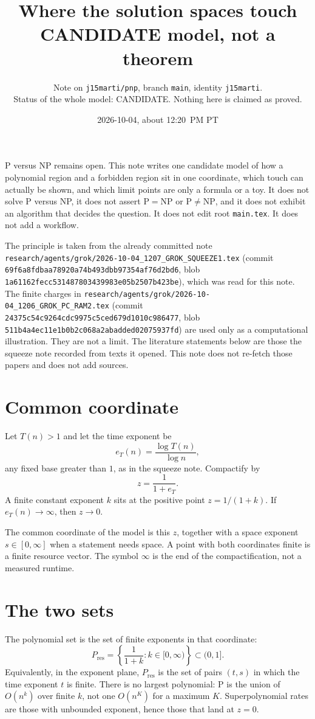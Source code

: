 \documentclass{article}
\title{Where the solution spaces touch\\
\large CANDIDATE model, not a theorem}
\author{Note on \texttt{j15marti/pnp}, branch \texttt{main}, identity \texttt{j15marti}.\\
Status of the whole model: CANDIDATE. Nothing here is claimed as proved.}
\date{2026-10-04, about 12:20~PM PT}
\begin{document}
\maketitle

\noindent
P versus NP remains open.
This note writes one candidate model of how a polynomial region and a forbidden region sit in one coordinate, which touch can actually be shown, and which limit points are only a formula or a toy.
It does not solve P versus NP, it does not assert \(\mathrm{P}=\mathrm{NP}\) or \(\mathrm{P}\neq\mathrm{NP}\), and it does not exhibit an algorithm that decides the question.
It does not edit root \texttt{main.tex}.
It does not add a workflow.

The principle is taken from the already committed note
\texttt{research/agents/grok/2026-10-04\_1207\_GROK\_SQUEEZE1.tex}
(commit \texttt{69f6a8fdbaa78920a74b493dbb97354af76d2bd6}, blob \texttt{1a61162fecc531487803439983e05b2507b423be}), which was read for this note.
The finite charges in
\texttt{research/agents/grok/2026-10-04\_1206\_GROK\_PC\_RAM2.tex}
(commit \texttt{24375c54c9264cdc9975c5ced679d1010c986477}, blob \texttt{511b4a4ec11e1b0b2c068a2abadded02075937fd})
are used only as a computational illustration.
They are not a limit.
The literature statements below are those the squeeze note recorded from texts it opened.
This note does not re-fetch those papers and does not add sources.

\section{Common coordinate}
Let \(T(n)>1\) and let the time exponent be
\[
e_T(n)=\frac{\log T(n)}{\log n},
\]
any fixed base greater than \(1\), as in the squeeze note.
Compactify by
\[
z=\frac{1}{1+e_T}.
\]
A finite constant exponent \(k\) sits at the positive point \(z=1/(1+k)\).
If \(e_T(n)\to\infty\), then \(z\to 0\).

The common coordinate of the model is this \(z\), together with a space exponent \(s\in[0,\infty]\) when a statement needs space.
A point with both coordinates finite is a finite resource vector.
The symbol \(\infty\) is the end of the compactification, not a measured runtime.

\section{The two sets}
The polynomial set is the set of finite exponents in that coordinate:
\[
P_{\mathrm{res}}
=
\left\{\frac{1}{1+k}:k\in[0,\infty)\right\}
\subset(0,1].
\]
Equivalently, in the exponent plane, \(P_{\mathrm{res}}\) is the set of pairs \((t,s)\) in which the time exponent \(t\) is finite.
There is no largest polynomial: \(\mathrm{P}\) is the union of \(O(n^k)\) over finite \(k\), not one \(O(n^K)\) for a maximum \(K\).
Superpolynomial rates are those with unbounded exponent, hence those that land at \(z=0\).
\end{document}
